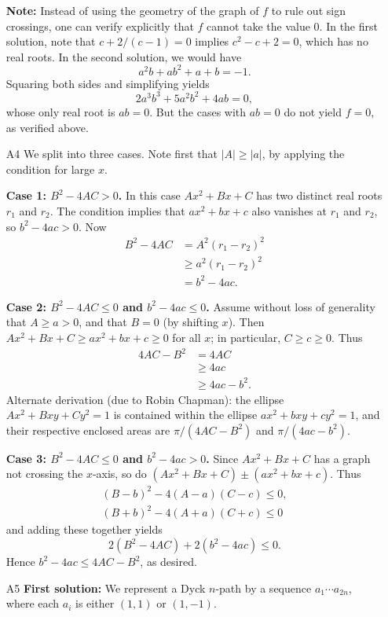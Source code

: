 \documentclass[amssymb,twocolumn,pra,10pt,aps]{revtex4-1}
\begin{document}
\begin{itemize}
\textbf{Note:} Instead of using the geometry of the graph of $f$ to rule
out sign crossings, one can verify explicitly that $f$ cannot
take the value 0. In the first solution, note that $c + 2/(c-1)=0$
implies $c^2 - c + 2 = 0$, which has no real roots.
In the second solution, we would have
\[
a^2 b + ab^2 + a + b =  -1.
\]
Squaring both sides and simplifying yields
\[
2a^3b^3 + 5a^2b^2 + 4ab = 0,
\]
whose only real root is $ab=0$. But the cases with $ab=0$ do not yield
$f=0$, as verified above.

\item[A4]
We split into three cases.
Note first that $|A| \geq |a|$, by applying the condition for large $x$.

\textbf{Case 1: $B^2 - 4AC > 0$.}
In this case $Ax^2 + Bx + C$ has two distinct real roots $r_1$ and $r_2$.
The condition implies that $ax^2 + bx + c$ also vanishes at $r_1$ and $r_2$,
so $b^2 - 4ac > 0$.
Now
\begin{align*}
B^2 - 4AC &= A^2(r_1-r_2)^2 \\
&\geq a^2(r_1 - r_2)^2 \\
&= b^2 - 4ac.
\end{align*}

\textbf{Case 2: $B^2 - 4AC \leq 0$ and $b^2 - 4ac \leq 0$.}
Assume without loss of generality that $A \geq a > 0$, and that $B=0$
(by shifting $x$). Then $Ax^2 + Bx + C \geq ax^2 + bx + c \geq 0$ for all $x$;
in particular, $C \geq c \geq 0$. Thus
\begin{align*}
4AC - B^2 &= 4AC \\
&\geq 4ac \\
&\geq 4ac - b^2.
\end{align*}
Alternate derivation (due to Robin Chapman): the ellipse
$Ax^2 + Bxy + Cy^2 = 1$ is contained within
the ellipse $ax^2 + bxy + cy^2 = 1$,
and their respective enclosed areas are $\pi/(4AC-B^2)$ and
$\pi/(4ac-b^2)$.

\textbf{Case 3: $B^2 - 4AC \leq 0$ and $b^2 - 4ac > 0$.}
Since $Ax^2 + Bx + C$ has a graph not crossing the $x$-axis,
so do $(Ax^2 + Bx + C) \pm (ax^2 + bx + c)$. Thus
\begin{gather*}
(B-b)^2 - 4(A-a)(C-c) \leq 0, \\
(B+b)^2 - 4(A+a)(C+c) \leq 0
\end{gather*}
and adding these together yields
\[
2(B^2 - 4AC) + 2(b^2 - 4ac) \leq 0.
\]
Hence $b^2 - 4ac \leq 4AC - B^2$, as desired.

\item[A5]
\textbf{First solution:}
We represent a Dyck $n$-path by a sequence $a_1\cdots a_{2n}$, where
each $a_i$ is either $(1,1)$ or $(1,-1)$.


\end{itemize}
\end{document}
